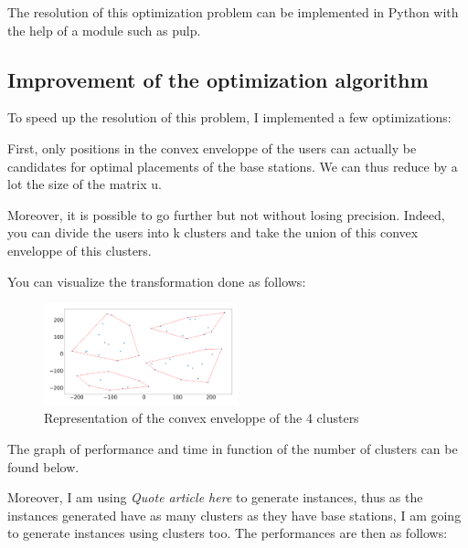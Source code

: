 \documentclass[letterpaper]{article}
\begin{document}
The resolution of this optimization problem can be implemented in Python with the help of a module such as pulp.

\subsection{Improvement of the optimization algorithm}

To speed up the resolution of this problem, I implemented a few optimizations:

First, only positions in the convex enveloppe of the users can actually be candidates for optimal placements of the base stations.
We can thus reduce by a lot the size of the matrix u.

Moreover, it is possible to go further but not without losing precision.
Indeed, you can divide the users into k clusters and take the union of this convex enveloppe of this clusters.

You can visualize the transformation done as follows:

\begin{figure}[H]
    \centering
    \includegraphics[width=0.5\textwidth]{images/four_cluster.png}
    \caption{Representation of the convex enveloppe of the 4 clusters}
\end{figure}

The graph of performance and time in function of the number of clusters can be found below.

Moreover, I am using \textit{Quote article here} to generate instances, thus as the instances generated have as many
clusters as they have base stations, I am going to generate instances using clusters too.
The performances are then as follows:
\end{document}
